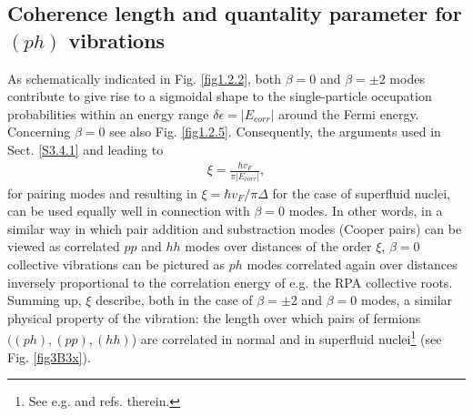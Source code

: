  \subsection{Coherence length and quantality parameter for $(ph)$ vibrations}\label{App4.B.2}
As schematically indicated in Fig. \ref{fig1.2.2}, both $\beta=0$ and $\beta=\pm2$ modes contribute to give rise to a sigmoidal shape to the single-particle occupation probabilities within an energy range $\delta\epsilon=|E_{corr}|$ around the Fermi energy. Concerning $\beta=0$ see also Fig. \ref{fig1.2.5}. Consequently, the arguments used in Sect. \ref{S3.4.1} and leading to 
\begin{align}\label{eq3.B.12}
 \xi=\frac{\hbar v_F}{\pi|E_{corr}|},
 \end{align}
 for pairing modes and resulting in $\xi=\hbar v_F/\pi\Delta$
 for the case of superfluid nuclei, can be used equally well in connection with $\beta=0$ modes. In other words, in a similar way in which pair addition and substraction modes (Cooper pairs) can be viewed as correlated $pp$ and $hh$ modes over distances of the order $\xi$, $\beta=0$ collective vibrations can be pictured as $ph$ modes correlated again over distances inversely proportional to the correlation energy of e.g. the RPA collective roots. Summing up, $\xi$ describe, both in the case of $\beta=\pm2$ and $\beta=0$ modes, a similar  physical property of the vibration: the  length over which  pairs of fermions $((ph),(pp),(hh)$)  are correlated in normal and in superfluid nuclei\footnote{See e.g. \cite{Barranco:19b} and refs. therein.} (see Fig. \ref{fig3B3x}). 
